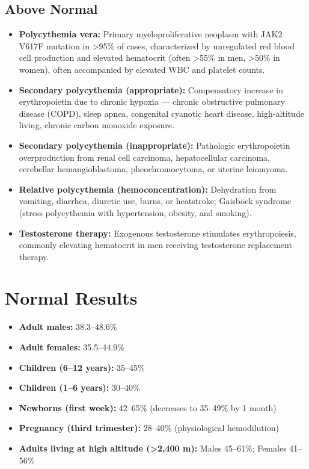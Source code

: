 \subsection*{Above Normal}
\begin{itemize}
  \item \textbf{Polycythemia vera:} Primary myeloproliferative neoplasm with JAK2 V617F mutation in >95\% of cases, characterized by unregulated red blood cell production and elevated hematocrit (often >55\% in men, >50\% in women), often accompanied by elevated WBC and platelet counts.
  \item \textbf{Secondary polycythemia (appropriate):} Compensatory increase in erythropoietin due to chronic hypoxia --- chronic obstructive pulmonary disease (COPD), sleep apnea, congenital cyanotic heart disease, high-altitude living, chronic carbon monoxide exposure.
  \item \textbf{Secondary polycythemia (inappropriate):} Pathologic erythropoietin overproduction from renal cell carcinoma, hepatocellular carcinoma, cerebellar hemangioblastoma, pheochromocytoma, or uterine leiomyoma.
  \item \textbf{Relative polycythemia (hemoconcentration):} Dehydration from vomiting, diarrhea, diuretic use, burns, or heatstroke; Gaisb\"{o}ck syndrome (stress polycythemia with hypertension, obesity, and smoking).
  \item \textbf{Testosterone therapy:} Exogenous testosterone stimulates erythropoiesis, commonly elevating hematocrit in men receiving testosterone replacement therapy.
\end{itemize}

\section*{Normal Results}
\begin{itemize}
  \item \textbf{Adult males:} 38.3--48.6\%
  \item \textbf{Adult females:} 35.5--44.9\%
  \item \textbf{Children (6--12 years):} 35--45\%
  \item \textbf{Children (1--6 years):} 30--40\%
  \item \textbf{Newborns (first week):} 42--65\% (decreases to 35--49\% by 1 month)
  \item \textbf{Pregnancy (third trimester):} 28--40\% (physiological hemodilution)
  \item \textbf{Adults living at high altitude (>2,400 m):} Males 45--61\%; Females 41--56\%
\end{itemize}

